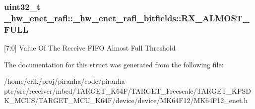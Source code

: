 \subsubsection[{\texorpdfstring{R\+X\+\_\+\+A\+L\+M\+O\+S\+T\+\_\+\+F\+U\+LL}{RX_ALMOST_FULL}}]{\setlength{\rightskip}{0pt plus 5cm}uint32\+\_\+t \+\_\+hw\+\_\+enet\+\_\+rafl\+::\+\_\+hw\+\_\+enet\+\_\+rafl\+\_\+bitfields\+::\+R\+X\+\_\+\+A\+L\+M\+O\+S\+T\+\_\+\+F\+U\+LL}\hypertarget{struct__hw__enet__rafl_1_1__hw__enet__rafl__bitfields_af8592f503aa95f030fa115c5c2a5fdb1}{}\label{struct__hw__enet__rafl_1_1__hw__enet__rafl__bitfields_af8592f503aa95f030fa115c5c2a5fdb1}
\mbox{[}7\+:0\mbox{]} Value Of The Receive F\+I\+FO Almost Full Threshold 

The documentation for this struct was generated from the following file\+:\begin{DoxyCompactItemize}
\item 
/home/erik/proj/piranha/code/piranha-\/ptc/src/receiver/mbed/\+T\+A\+R\+G\+E\+T\+\_\+\+K64\+F/\+T\+A\+R\+G\+E\+T\+\_\+\+Freescale/\+T\+A\+R\+G\+E\+T\+\_\+\+K\+P\+S\+D\+K\+\_\+\+M\+C\+U\+S/\+T\+A\+R\+G\+E\+T\+\_\+\+M\+C\+U\+\_\+\+K64\+F/device/device/\+M\+K64\+F12/M\+K64\+F12\+\_\+enet.\+h\end{DoxyCompactItemize}
